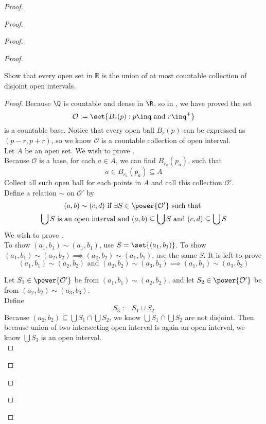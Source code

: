 \documentclass{report}
\begin{document}
\begin{proof}
\begin{proof}
\begin{proof}
\begin{proof}
\begin{question}{}{}
Show that every open set in \( \mathbb{R} \) is the union of at most countable collection of disjoint open intervals.
\end{question}
\begin{proof}
Because $\Q$ is countable and dense in  $\R$, so in , we have proved the set
\begin{equation*}
\mathcal{O}:=\set{B_r(p):p\inq\text{ and }r\inq^+}
\end{equation*}
is a countable base. Notice that every open ball $B_r(p)$ can be expressed as $(p-r,p+r)$, so we know $\mathcal{O}$ is a countable collection of open interval.\\

Let $A$ be an open set. We wish to prove .\\


Because $\mathcal{O}$ is a base, for each $a\in A$, we can find $B_{r_a}(p_a)$, such that
\begin{equation*}
a\in B_{r_a}(p_a)\subseteq A
\end{equation*}
Collect all such open ball for each points in $A$ and call this collection  $\mathcal{O}'$.\\

Define a relation $\sim$ on $\mathcal{O}'$ by 
\begin{gather*}
  (a,b)\sim (c,d) \text{ if }\exists S\in \power{\mathcal{O}'}\text{ such that }\\
  \bigcup S\text{ is an open interval and }(a,b)\subseteq\bigcup S\text{ and }(c,d)\subseteq \bigcup S
\end{gather*}
We wish to prove .\\

To show $(a_1,b_1)\sim (a_1,b_1)$, use $S=\set{(a_1,b_1)}$. To show $(a_1,b_1)\sim (a_2,b_2)\implies (a_2,b_2)\sim (a_1,b_1)$, use the same $S$. It is left to prove
\begin{equation*}
  (a_1,b_1)\sim (a_2,b_2)\text{ and }(a_2,b_2)\sim (a_3,b_3)\implies (a_1,b_1)\sim (a_3,b_3)
\end{equation*}

Let $S_1\in \power{\mathcal{O}'}$ be from $(a_1,b_1)\sim (a_2,b_2)$, and let $S_2\in \power{\mathcal{O}'}$ be from $(a_2,b_2)\sim (a_3,b_3)$.\\

Define 
\begin{equation*}
S_3:=S_1\cup S_2 
\end{equation*}
Because $(a_2,b_2)\subseteq \bigcup S_1\cap \bigcup S_2$, we know $\bigcup S_1\cap \bigcup S_2$ are not disjoint. Then because union of two intersecting open interval is again an open interval, we know $\bigcup S_3$ is an open interval.\\


\end{proof}
\end{proof}
\end{proof}
\end{proof}
\end{proof}
\end{document}

